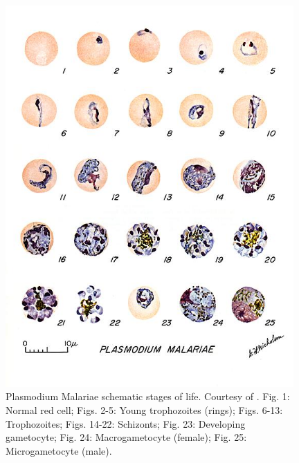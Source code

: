 \documentclass[final,a4paper,12pt,english]{UnicaPhdThesis3}
\begin{document}
{\begin{figure}[!htbp]
	\centering
	\includegraphics[width=0.98\textwidth]{images/malaria_th/mal_mal}
	\caption{\label{fig:mal_th} Plasmodium Malariae schematic stages of life. Courtesy of \cite{Med_cdc}.
		Fig. 1: Normal red cell; Figs. 2-5: Young trophozoites (rings); Figs. 6-13: Trophozoites; Figs. 14-22: Schizonts; Fig. 23: Developing gametocyte; Fig. 24: Macrogametocyte (female); Fig. 25: Microgametocyte (male).}
\end{figure}

}
\end{document}
